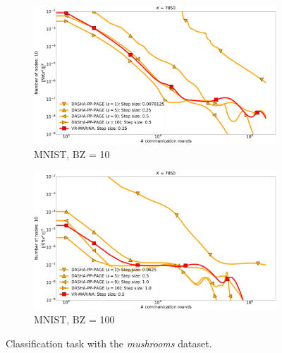 \documentclass{article}
\begin{document}
\begin{figure}[h]
    \begin{subfigure}{.5\textwidth}
        \includegraphics[width=\textwidth]{neurips_2022_finite_sum_mnist_nof_7850_numnodes_10_more_probs_batch_size_10_split_by_labels_logistic.pdf}
        \caption{MNIST, BZ = 10}
    \end{subfigure}
    \begin{subfigure}{.5\textwidth}
        \includegraphics[width=\textwidth]{neurips_2022_finite_sum_mnist_nof_7850_numnodes_10_more_probs_batch_size_100_split_by_labels_logistic.pdf}
        \caption{MNIST, BZ = 100}
    \end{subfigure}
\caption{Classification task with the \textit{mushrooms} dataset.}
\label{fig:finite-sum-mnist}
\end{figure}
\end{document}

